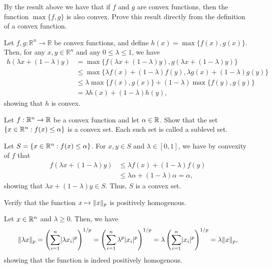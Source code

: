 \begin{exercise}
  By the result above we have that if $f$ and $g$ are convex functions, then the function $\max\{f, g\}$ is also convex.
  Prove this result directly from the definition of a convex function.
\end{exercise}

\begin{solution}
  Let $f, g : \mathbb{R}^n \to \mathbb{R}$ be convex functions, and define $h(x) = \max\{f(x), g(x)\}$.
  Then, for any $x, y \in \mathbb{R}^n$ and any $0 \leq \lambda \leq 1$, we have
  \begin{align*}
    h(\lambda x + (1 - \lambda) y)
    &= \max\{f(\lambda x + (1 - \lambda) y), g(\lambda x + (1 - \lambda) y)\} \\
    &\leq \max\{\lambda f(x) + (1 - \lambda) f(y), \lambda g(x) + (1 - \lambda) g(y)\} \\
    &\leq \lambda \max\{f(x), g(x)\} + (1 - \lambda) \max\{f(y), g(y)\} \\
    &= \lambda h(x) + (1 - \lambda) h(y),
  \end{align*}
  showing that $h$ is convex.
\end{solution}

\begin{exercise}
  Let $f : \mathbb{R}^n \to \mathbb{R}$ be a convex function and let $\alpha \in \mathbb{R}$.
  Show that the set $\{ x \in \mathbb{R}^n : f(x) \leq \alpha \}$ is a convex set.
  Each such set is called a sublevel set.
\end{exercise}

\begin{solution}
  Let $S = \{ x \in \mathbb{R}^n : f(x) \leq \alpha \}$.
  For $x, y \in S$ and $\lambda \in [0, 1]$, we have by convexity of $f$ that
  \begin{align*}
    f( \lambda x + (1 - \lambda) y )
    &\leq \lambda f(x) + (1 - \lambda) f(y) \\
    &\leq \lambda \alpha + (1 - \lambda) \alpha = \alpha,
  \end{align*}
  showing that $\lambda x + (1 - \lambda) y \in S$.
  Thus, $S$ is a convex set.
\end{solution}

\begin{exercise}
  Verify that the function $x \mapsto \lVert x\rVert_p$ is positively homogenous.
\end{exercise}

\begin{solution}
  Let $x \in \mathbb{R}^n$ and $\lambda \geq 0$.
  Then, we have
  \begin{equation}
    \lVert\lambda x\rVert_p
    = \left( \sum_{i=1}^n \lvert\lambda x_i\rvert^p \right)^{1/p}
    = \left( \sum_{i=1}^n \lambda^p \lvert x_i\rvert^p \right)^{1/p}
    = \lambda \left( \sum_{i=1}^n \lvert x_i\rvert^p \right)^{1/p}
    = \lambda \lVert x\rVert_p,
  \end{equation}
  showing that the function is indeed positively homogenous.
\end{solution}

